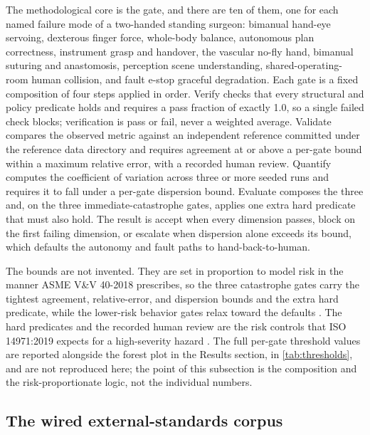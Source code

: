 The methodological core is the gate, and there are ten of them, one for each
named failure mode of a two-handed standing surgeon: bimanual hand-eye servoing,
dexterous finger force, whole-body balance, autonomous plan correctness,
instrument grasp and handover, the vascular no-fly hand, bimanual suturing and
anastomosis, perception scene understanding, shared-operating-room human
collision, and fault e-stop graceful degradation. Each gate is a fixed
composition of four steps applied in order. Verify checks that every structural
and policy predicate holds and requires a pass fraction of exactly 1.0, so a
single failed check blocks; verification is pass or fail, never a weighted
average. Validate compares the observed metric against an independent reference
committed under the reference data directory and requires agreement at or above a
per-gate bound within a maximum relative error, with a recorded human review.
Quantify computes the coefficient of variation across three or more seeded runs
and requires it to fall under a per-gate dispersion bound. Evaluate composes the
three and, on the three immediate-catastrophe gates, applies one extra hard
predicate that must also hold. The result is accept when every dimension passes,
block on the first failing dimension, or escalate when dispersion alone exceeds
its bound, which defaults the autonomy and fault paths to hand-back-to-human.

The bounds are not invented. They are set in proportion to model risk in the
manner ASME V\&V 40-2018 prescribes, so the three catastrophe gates carry the
tightest agreement, relative-error, and dispersion bounds and the extra hard
predicate, while the lower-risk behavior gates relax toward the defaults
\cite{asmevv40}. The hard predicates and the recorded human review are the risk
controls that ISO 14971:2019 expects for a high-severity hazard \cite{iso14971}.
The full per-gate threshold values are reported alongside the forest plot in the
Results section, in \autoref{tab:thresholds}, and are not reproduced here; the
point of this subsection is the composition and the risk-proportionate logic, not
the individual numbers.

\subsection{The wired external-standards corpus}

